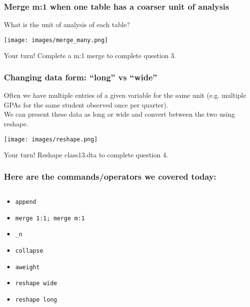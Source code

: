 \documentclass[11pt]{beamer}
\begin{document}
\begin{frame}
\frametitle{Merge m:1 when one table has a coarser unit of analysis}
What is the unit of analysis of each table?
\begin{center}
	\texttt{[image: images/merge\_many.png]}
\end{center} \pause \bigskip
Your turn! Complete a m:1 merge to complete question 3.
\end{frame}

\begin{frame}
\frametitle{Changing data form: ``long'' vs ``wide''}
Often we have multiple entries of a given variable for the same unit (e.g. multiple GPAs for the same student observed once per quarter). \\ \bigskip
We can present these data as \alert{long} or \alert{wide} and convert between the two using \alert{reshape}.
\begin{center}
	\texttt{[image: images/reshape.png]}
\end{center} \pause \bigskip
Your turn! Reshape class13.dta to complete question 4.
\end{frame}

\begin{frame}
\frametitle{Here are the commands/operators we covered today:}
\begin{columns}
	\begin{column}{0.5\textwidth}
		\begin{itemize}
			\item \texttt{append}
			\item \texttt{merge 1:1; merge m:1}
			\item \texttt{\_n}
			\item \texttt{collapse}
			\item \texttt{aweight}
			\item \texttt{reshape wide}
			\item \texttt{reshape long}
		\end{itemize}
	\end{column}
	\begin{column}{0.5\textwidth}
	\end{column}
\end{columns}
\end{frame}
\end{document}
